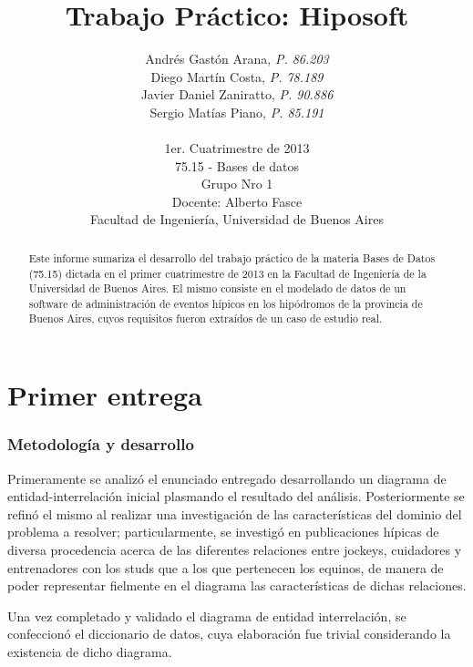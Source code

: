 \documentclass[a4paper,11pt]{article}
\title{\textbf{Trabajo Práctico: Hiposoft}}
\author{%
  Andrés Gastón Arana,     \textit{P. 86.203}                      \\
  Diego Martín Costa,      \textit{P. 78.189}                      \\
  Javier Daniel Zaniratto, \textit{P. 90.886}                      \\
  Sergio Matías Piano,     \textit{P. 85.191}                      \\
  \\
  \normalsize{1er. Cuatrimestre de 2013}                           \\
  \normalsize{75.15 - Bases de datos}                              \\
  \normalsize{Grupo Nro 1}		                           \\
  \normalsize{Docente: Alberto Fasce}	                           \\
  \normalsize{Facultad de Ingeniería, Universidad de Buenos Aires}
}
\date{}
\begin{document}
\thispagestyle{empty}
\maketitle

\begin{abstract}

  Este informe sumariza el desarrollo del trabajo práctico de la materia Bases
  de Datos (75.15) dictada en el primer cuatrimestre de 2013 en la Facultad de
  Ingeniería de la Universidad de Buenos Aires. El mismo consiste en el
  modelado de datos de un software de administración de eventos hípicos en los
  hipódromos de la provincia de Buenos Aires, cuyos requisitos fueron extraídos
  de un caso de estudio real.

\end{abstract}

\clearpage

\tableofcontents
\clearpage


\part{Primer entrega}

\section{Metodología y desarrollo}

Primeramente se analizó el enunciado entregado desarrollando un diagrama de
entidad-interrelación inicial plasmando el resultado del análisis.
Posteriormente se refinó el mismo al realizar una investigación de las
características del dominio del problema a resolver; particularmente, se
investigó en publicaciones hípicas de diversa procedencia acerca de las
diferentes relaciones entre jockeys, cuidadores y entrenadores con los studs
que a los que pertenecen los equinos, de manera de poder representar fielmente
en el diagrama las características de dichas relaciones.

Una vez completado y validado el diagrama de entidad interrelación, se
confeccionó el diccionario de datos, cuya elaboración fue trivial considerando
la existencia de dicho diagrama.
\end{document}
